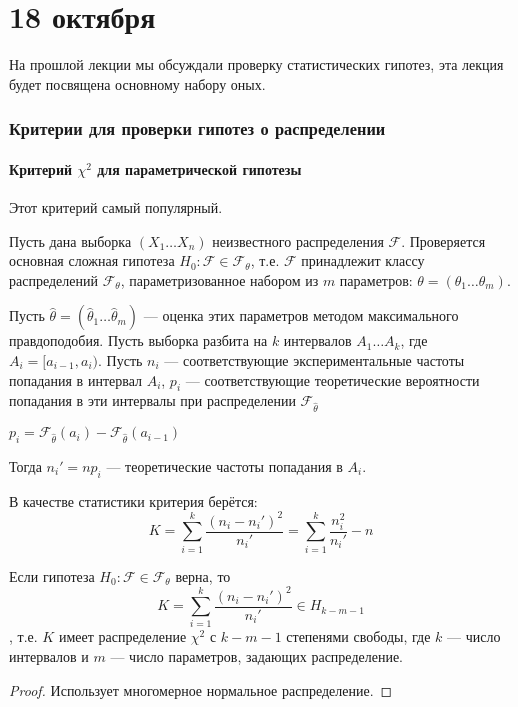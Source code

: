 \chapter{18 октября}

На прошлой лекции мы обсуждали проверку статистических гипотез, эта лекция будет посвящена основному набору оных.

\subsection{Критерии для проверки гипотез о распределении}

\subsubsection{Критерий \(\chi^2\) для параметрической гипотезы}

Этот критерий самый популярный.

Пусть дана выборка \((X_1 \dots X_n)\) неизвестного распределения \(\mathcal{F}\). Проверяется основная сложная гипотеза \(H_0 : \mathcal{F} \in \mathcal{F}_\theta\), т.е. \(\mathcal{F}\) принадлежит классу распределений \(\mathcal{F}_\theta\), параметризованное набором из \(m\) параметров: \(\theta = (\theta_1 \dots \theta_m)\).

Пусть \(\hat{\theta} = (\hat{\theta}_1 \dots \hat{\theta}_m)\) --- оценка этих параметров методом максимального правдоподобия. Пусть выборка разбита на \(k\) интервалов \(A_1 \dots A_k\), где \(A_i = [a_{i-1}, a_i)\). Пусть \(n_i\) --- соответствующие экспериментальные частоты попадания в интервал \(A_i\), \(p_i\) --- соответствующие теоретические вероятности попадания в эти интервалы при распределении \(\mathcal{F}_{ \hat{\theta}}\)

\begin{remark}
    \(p_i = \mathcal{F}_{ \hat{\theta}}(a_i) - \mathcal{F}_{ \hat{\theta}}(a_{i-1})\)
\end{remark}

Тогда \(n_i' = np_i\) --- теоретические частоты попадания в \(A_i\).

В качестве статистики критерия берётся:
\[K = \sum_{i=1}^{k} \frac{(n_i - n_i')^2}{n_i'} = \sum_{i=1}^{k} \frac{n_i^2}{n_i'} - n\]

\begin{theorem}[Фишера]
    Если гипотеза \(H_0 : \mathcal{F} \in \mathcal{F}_\theta\) верна, то
    \[K = \sum_{i=1}^{k} \frac{(n_i - n_i')^2}{n_i'} \in H_{k - m - 1}\]
    , т.е. \(K\) имеет распределение \(\chi^2\) с \(k - m - 1\) степенями свободы, где \(k\) --- число интервалов и \(m\) --- число параметров, задающих распределение.
\end{theorem}
\begin{proof}
    Использует многомерное нормальное распределение.
\end{proof}

